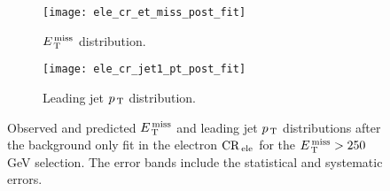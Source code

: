 \begin{figure}[!htb]
  \centering
  \begin{subfigure}[t]{.48\linewidth}
    \texttt{[image: ele\_cr\_et\_miss\_post\_fit]}
    \caption{$E_\mathrm{\, T}^\mathrm{\, miss}$ distribution.}
    \label{fig:ele_cr_et_miss_pre_fit}
  \end{subfigure}
  \begin{subfigure}[t]{.48\linewidth}
    \texttt{[image: ele\_cr\_jet1\_pt\_post\_fit]}
    \caption{Leading jet $p_\mathrm{\, T}$ distribution.}
    \label{fig:ele_cr_jet1_pt_pre_fit}
  \end{subfigure}
  \caption{Observed and predicted $E_\mathrm{\, T}^\mathrm{\, miss}$ and leading jet $p_\mathrm{\, T}$ distributions
    after the background only fit in the electron $\mathrm{CR}_\mathrm{\, ele}$ for the
    $E_\mathrm{\, T}^\mathrm{\, miss} > 250~$GeV selection. The error bands include the statistical and
    systematic errors.}
  \label{fig:ele_cr_plots}
\end{figure}
